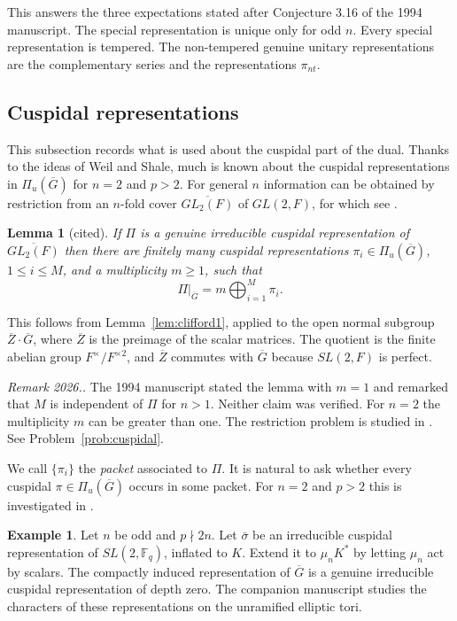 \documentclass[12pt,letterpaper]{article}
\numberwithin{equation}{section}
\newtheorem{lemma}[theorem]{Lemma}
\theoremstyle{definition}
\newtheorem{xexample}[theorem]{Example}
\newcounter{rmk}
\newcommand{\unverified}[1]{\refstepcounter{rmk}\par\smallskip\noindent\textit{Remark 2026.\arabic{rmk}.} #1\par\smallskip}
\newcommand{\cited}{cited}
\newcommand{\bG}{\overline{G}}
\newcommand{\Piu}{\Pi_{u}(\bG)}
\begin{document}
This answers the three expectations stated after Conjecture 3.16 of the 1994 manuscript.
The special representation is unique only for odd $n$.  Every special representation is
tempered.  The non-tempered genuine unitary representations are the complementary series
and the representations $\pi_{nt}$.

\subsection{Cuspidal representations}\label{subsec:cuspidal}

This subsection records what is used about the cuspidal part of the dual.  Thanks to the
ideas of Weil and Shale, much is known about the cuspidal representations in $\Piu$ for
$n=2$ and $p>2$.  For general $n$ information can be obtained by restriction from an
$n$-fold cover $\overline{GL_2(F)}$ of $GL(2,F)$, for which see \cite{Fl80,Bl85,GSS26}.

\begin{lemma}[\cited]\label{lem:restriction}
If $\Pi$ is a genuine irreducible cuspidal representation of $\overline{GL_2(F)}$ then
there are finitely many cuspidal representations $\pi_i\in\Piu$, $1\le i\le M$, and a
multiplicity $m\ge1$, such that
\[
\Pi|_{\bG}=m\bigoplus_{i=1}^M\pi_i .
\]
\end{lemma}
This follows from Lemma~\ref{lem:clifford1}, applied to the open normal subgroup
$\overline{Z}\cdot\bG$, where $\overline Z$ is the preimage of the scalar matrices.  The
quotient is the finite abelian group $F^\times/F^{\times2}$, and $\overline Z$ commutes with
$\bG$ because $SL(2,F)$ is perfect.

\unverified{The 1994 manuscript stated the lemma with $m=1$ and remarked that $M$ is
independent of $\Pi$ for $n>1$.  Neither claim was verified.  For $n=2$ the multiplicity
$m$ can be greater than one.  The restriction problem is studied in \cite{GSS26}.  See
Problem~\ref{prob:cuspidal}.}

We call $\{\pi_i\}$ the \emph{packet} associated to $\Pi$.  It is natural to ask whether
every cuspidal $\pi\in\Piu$ occurs in some packet.  For $n=2$ and $p>2$ this is
investigated in \cite{GPS83}.

\begin{xexample}\label{ex:depth-zero}
Let $n$ be odd and $p\nmid2n$.  Let $\bar\sigma$ be an irreducible cuspidal representation
of $SL(2,\mathbb F_q)$, inflated to $K$.  Extend it to $\mu_nK^*$ by letting $\mu_n$ act by
scalars.  The compactly induced representation of $\bG$ is a genuine irreducible cuspidal
representation of depth zero.  The companion manuscript \cite{JoCh} studies the
characters of these representations on the unramified elliptic tori.
\end{xexample}
\end{document}
